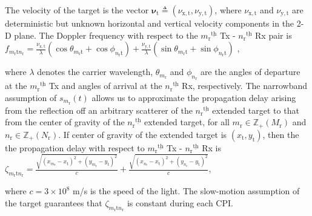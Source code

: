 \documentclass[9pt,journal]{IEEEtran}
\newcommand{\paren}[1]{\left({#1}\right)}
\newcommand{\ith}[1]    {{#1}^{\underline{\text{th}}}}
\newcommand{\rr}{_\mathrm{r}}
\newcommand{\target}{\mathrm{t}}
\theoremstyle{definition}
\begin{document}
The velocity of the target is the vector  $\boldsymbol{\nu}_{\mathrm{t}}\triangleq\left(\nu_\mathrm{\mathrm{x},\mathrm{t}},\nu_\mathrm{\mathrm{y},\mathrm{t}} \right)$, where $\nu_\mathrm{\mathrm{x},\mathrm{t}}$ and $\nu_\mathrm{\mathrm{y},\mathrm{t}}$ are deterministic but unknown horizontal and vertical velocity components in the 2-D plane. The Doppler frequency with respect to the $\ith{m\rr}$ Tx - $\ith{n\rr}$ Rx pair is $f_{m_\mathrm{r}\target n_\mathrm{r}} = \frac{\nu_\mathrm{\mathrm{x},\mathrm{t}}}{\lambda}(\cos\theta_{m_\mathrm{r}\target}+\cos\phi_{n_\mathrm{r}\target})+\frac{\nu_\mathrm{\mathrm{y},\target}}{\lambda}(\sin\theta_{m_\mathrm{r}\target}+\sin\phi_{n_\mathrm{r}\target})$ \cite{hongbin_movingtarget},

where $\lambda$ denotes the carrier wavelength, $\theta_{m_\mathrm{r}}$ and $\phi_{n_\mathrm{r}}$ are the angles of departure at the $\ith{m_\mathrm{r}}$ Tx and angles of arrival at the $\ith{n_\mathrm{r}}$ Rx, respectively. %
The narrowband assumption of $s_{m\rr}(t)$ allows us to approximate the propagation delay arising from the reflection off an arbitrary scatterer of the $\ith{n_\mathrm{r}}$ extended target to that from the center of gravity of the $\ith{n_\mathrm{r}}$ extended target, for all $m_\mathrm{r}\in\mathbb{Z}_{+}(M_\mathrm{r})$ and $n_\mathrm{r}\in\mathbb{Z}_{+}(N_\mathrm{r})$\cite{haimovich2008mimo}. If center of gravity of the extended target is $(x_{\mathrm{t}},y_{\mathrm{t}})$, then the the propagation delay with respect to $\ith{m\rr}$ Tx - $\ith{n\rr}$ Rx  is
$\zeta_{m\rr \target n\rr}=\frac{\sqrt{\paren{x_{m\rr}-x_{\mathrm{t}}}^2+\paren{y_{m\rr}-y_{\mathrm{t}}}^2}}{c}
		+\frac{\sqrt{\paren{x_{n\rr}-x_{\mathrm{t}}}^2+\paren{y_{n\rr}-y_{\mathrm{t}}}^2}}{c},$

where $c=3\times 10^8$ m/s is the speed of the light. The slow-motion assumption of the target guarantees that $\zeta_{m\rr \target n\rr }$ is constant during each CPI. %
\end{document}
